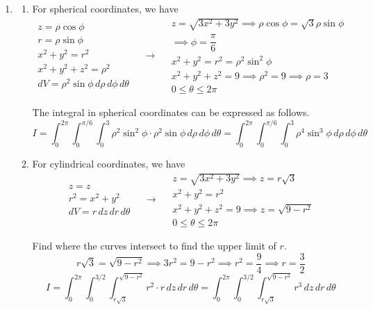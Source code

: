\documentclass[a4paper, 12pt]{article}
\begin{document}
\begin{enumerate}[leftmargin=*,label=\textbf{\arabic*.}]
Therefore, $\boxed{{I_1}=\frac23(\sin1-\cos1)}$.

\item \begin{enumerate}[leftmargin=*,label=\textbf{\alph*.}]
\item
For spherical coordinates, we have
\[
\begin{array}{c}
z=\rho\cos\phi\\
r=\rho\sin\phi\\
x^2+y^2=r^2\\
x^2+y^2+z^2=\rho^2\\
dV=\rho^2\sin\phi\,d\rho\,d\phi\,d\theta
\end{array}\quad\rightarrow\quad
\begin{array}{c}
\displaystyle z=\sqrt{3x^2+3y^2}\implies\rho\cos\phi=\sqrt3\rho\sin\phi\\[0.2cm]\implies\phi=\dfrac\pi6\\[0.2cm]
x^2+y^2=r^2=\rho^2\sin^2\phi\\[0.1cm]
x^2+y^2+z^2=9\implies\rho^2=9\implies\rho=3\\[0.1cm]
0\leq\theta\leq2\pi
\end{array}
\]

The integral in spherical coordinates can be expressed as follows.
\[\boxed{{I}=\int_0^{2\pi}\int_0^{\pi/6}\int_{0}^3\rho^2\sin^2\phi\cdot\rho^2\sin\phi\,d\rho\,d\phi\,d\theta=\int_0^{2\pi}\int_0^{\pi/6}\int_{0}^3\rho^4\sin^3\phi\,d\rho\,d\phi\,d\theta}\]

\item For cylindrical coordinates, we have
\[
\begin{array}{c}
z=z\\
r^2=x^2+y^2\\
dV=r\,dz\,dr\,d\theta
\end{array}\quad\rightarrow\quad
\begin{array}{c}
z=\sqrt{3x^2+3y^2}\implies z=r\sqrt3\\[0.1cm]
x^2+y^2=r^2\\[0.1cm]
x^2+y^2+z^2=9\implies z=\sqrt{9-r^2}\\[0.1cm]
0\leq\theta\leq2\pi
\end{array}
\]

Find where the curves intersect to find the upper limit of $r$.
\[r\sqrt3=\sqrt{9-r^2}\implies3r^2=9-r^2\implies r^2=\frac94\implies r=\frac32\]
\[\boxed{{I}=\int_0^{2\pi}\int_0^{3/2}\int_{r\sqrt3}^{\sqrt{9-r^2}}r^2\cdot r\,dz\,dr\,d\theta=\int_0^{2\pi}\int_0^{3/2}\int_{r\sqrt3}^{\sqrt{9-r^2}}r^3\,dz\,dr\,d\theta}\]
\end{enumerate}
\end{enumerate}
\end{document}

